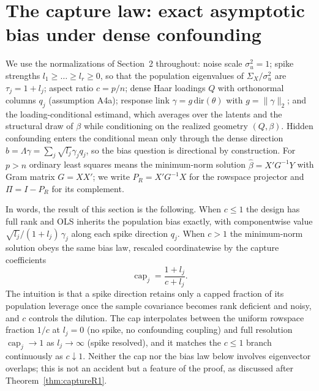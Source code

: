 \section{The capture law: exact asymptotic bias under dense confounding}\label{sec:capture}

We use the normalizations of Section~2 throughout: noise scale $\sigma_u^2=1$; spike strengths $l_1\ge\dots\ge l_r\ge 0$, so that the population eigenvalues of $\Sigma_X/\sigma_u^2$ are $\tau_j=1+l_j$; aspect ratio $c=p/n$; dense Haar loadings $Q$ with orthonormal columns $q_j$ (assumption A4a); response link $\gamma=g\,\mathrm{dir}(\theta)$ with $g=\|\gamma\|_2$; and the loading-conditional estimand, which averages over the latents and the structural draw of $\beta$ while conditioning on the realized geometry $(Q,\beta)$. Hidden confounding enters the conditional mean only through the dense direction $b=\Lambda\gamma=\sum_j \sqrt{l_j}\gamma_j q_j$, so the bias question is directional by construction. For $p>n$ ordinary least squares means the minimum-norm solution $\hat\beta=X'G^{-1}Y$ with Gram matrix $G=XX'$; we write $P_R=X'G^{-1}X$ for the rowspace projector and $\Pi=I-P_R$ for its complement.

In words, the result of this section is the following. When $c\le 1$ the design has full rank and OLS inherits the population bias exactly, with componentwise value $\sqrt{l_j}/(1+l_j)\,\gamma_j$ along each spike direction $q_j$. When $c>1$ the minimum-norm solution obeys the same bias law, rescaled coordinatewise by the capture coefficients
\[
\operatorname{cap}_j=\frac{1+l_j}{c+l_j}.
\]
The intuition is that a spike direction retains only a capped fraction of its population leverage once the sample covariance becomes rank deficient and noisy, and $c$ controls the dilution. The cap interpolates between the uniform rowspace fraction $1/c$ at $l_j=0$ (no spike, no confounding coupling) and full resolution $\operatorname{cap}_j\to 1$ as $l_j\to\infty$ (spike resolved), and it matches the $c\le 1$ branch continuously as $c\downarrow 1$. Neither the cap nor the bias law below involves eigenvector overlaps; this is not an accident but a feature of the proof, as discussed after Theorem~\ref{thm:captureR1}.

